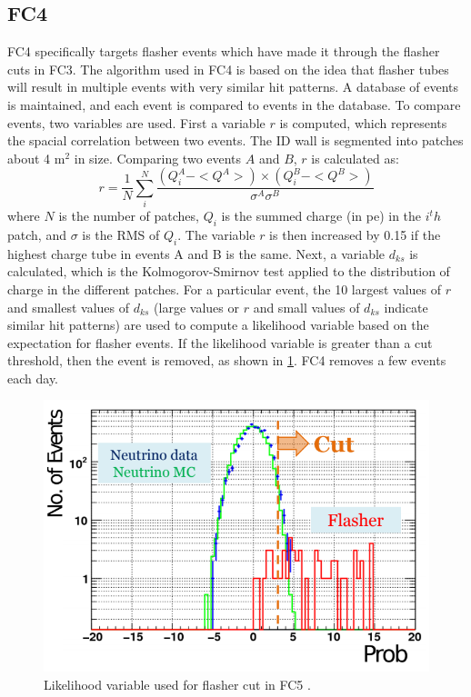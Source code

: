 \subsection{FC4}
FC4 specifically targets flasher events which have made it through the flasher cuts in FC3.  The algorithm used in FC4 is based on the idea that flasher tubes will result in multiple events with very similar hit patterns.  A database of events is maintained, and each event is compared to events in the database.  To compare events, two variables are used.  First a variable $r$ is computed, which represents the spacial correlation between two events.  The ID wall is segmented into patches about 4 m$^2$ in size.  Comparing two events $A$ and $B$, $    r$ is calculated as:
\begin{equation}
r=\frac{1}{N} \sum \limits_i^N \frac{(Q_i^A-<Q^A>)\times(Q_i^B-<Q^B>)}{\sigma^A \sigma^B}
\end{equation}
where $N$ is the number of patches, $Q_i$ is the summed charge (in pe) in the $i^th$ patch, and $\sigma$ is the RMS of $Q_i$.  The variable $r$ is then increased by 0.15 if the highest charge tube in events A and B is the same.  Next, a variable $d_{ks}$ is calculated, which is the Kolmogorov-Smirnov test applied to the distribution of charge in the different patches.  For a particular event, the 10 largest values of $r$ and smallest values of $d_{ks}$ (large values or $r$ and small values of $d_{ks}$ indicate similar hit patterns) are used to compute a likelihood variable based on the expectation for flasher events.  If the likelihood variable is greater than a cut threshold, then the event is removed, as shown in \cref{fig:flasher_cut}.  FC4 removes a few events each day.   
\begin{figure}
\centering
\includegraphics[width=0.5 \textwidth,keepaspectratio=true]{figures/Flasher_cut.png}
\caption{Likelihood variable used for flasher cut in FC5 \cite{Richardson:2015kd}.}
\label{fig:flasher_cut}
\end{figure}
